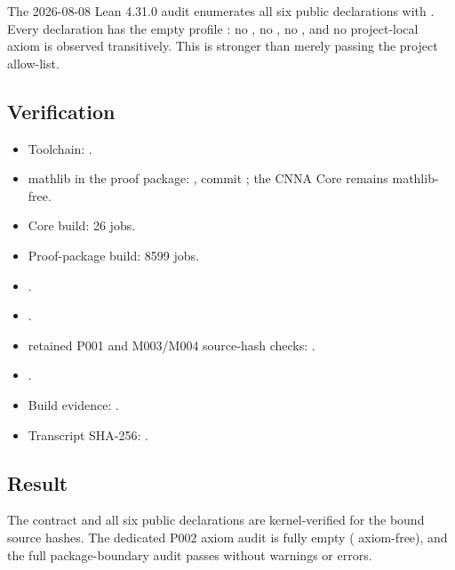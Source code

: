 The 2026-08-08 Lean 4.31.0 audit enumerates all six public declarations
with \texttt{\protect{}}. Every declaration has the empty profile
\texttt{\protect\seqsplit{{[}{]}}}: no \texttt{\protect{}}, no \texttt{\protect{}}, no
\texttt{\protect{}}, and no project-local axiom is observed
transitively. This is stronger than merely passing the project
allow-list.

\subsection{Verification}\label{verification}

\begin{itemize}
\tightlist
\item
  Toolchain: \texttt{\protect{}}.
\item
  mathlib in the proof package: \texttt{\protect{}}, commit
  \texttt{\protect{}}; the CNNA Core
  remains mathlib-free.
\item
  Core build: 26 jobs.
\item
  Proof-package build: 8599 jobs.
\item
  \texttt{\protect{}}.
\item
  \texttt{\protect{}}.
\item
  retained P001 and M003/M004 source-hash checks: \texttt{\protect{}}.
\item
  \texttt{\protect{}}.
\item
  Build evidence:
  \texttt{\protect{}}.
\item
  Transcript SHA-256:
  \texttt{\protect{}}.
\end{itemize}

\subsection{Result}\label{result-6}

The contract and all six public declarations are kernel-verified for the
bound source hashes. The dedicated P002 axiom audit is fully empty
(\texttt{\protect{}} axiom-free), and the full package-boundary audit passes
without warnings or errors.

